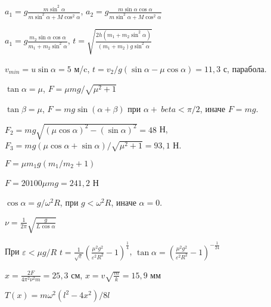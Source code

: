 \begin{Answer}{50}
$a_1 = g \frac{m \sin^2 \alpha}{m \sin^2 \alpha + M \cos^2 \alpha}$, $a_2 = g\frac{m \sin \alpha \cos \alpha}{m \sin^2 \alpha + M \cos^2 \alpha}$
\end{Answer}
\begin{Answer}{51}
$a_1 = g \frac{m_2 \sin \alpha \cos \alpha}{m_1 + m_2 \sin^2 \alpha}$, $t=\sqrt{\frac{2h(m_1+m_2\sin^2\alpha)}{(m_1+m_2)g \sin^2 \alpha}}$
\end{Answer}
\begin{Answer}{52}
$v_{min} = u \sin \alpha = 5$ м/c, $t = v_2/g(\sin \alpha - \mu \cos \alpha) = 11,3$ с, парабола.
\end{Answer}
\begin{Answer}{53}
$\tan \alpha = \mu$, $F = \mu mg / \sqrt{\mu^2 + 1}$
\end{Answer}
\begin{Answer}{54}
$\tan \beta = \mu$, $F = mg \sin (\alpha + \beta)$ при $\alpha + \ beta < \pi/2$, иначе $F = mg$.
\end{Answer}
\begin{Answer}{55}
$F_2 = mg \sqrt{(\mu \cos \alpha)^2 - (\sin \alpha)^2} = 48$ Н, $F_3 = mg(\mu \cos \alpha + \sin \alpha)/\sqrt{\mu^2 + 1} = 93,1$ Н.
\end{Answer}
\begin{Answer}{56}
$F = \mu m_1 g \left(m_1/m_2 + 1 \right)$
\end{Answer}
\begin{Answer}{57}
$F = 20100 \mu mg = 241,2$ Н
\end{Answer}
\begin{Answer}{58}
$\cos \alpha = g/\omega^2 R$, при $g < \omega^2 R$, иначе $\alpha = 0$.
\end{Answer}
\begin{Answer}{59}
$\nu = \frac{1}{2\pi}\sqrt{\frac{g}{L \cos \alpha}}$
\end{Answer}
\begin{Answer}{60}
При $\varepsilon < \mu g /R$ $t=\frac{1}{\sqrt{\varepsilon}}\left( \frac{\mu^2 g^2}{\varepsilon^2 R^2} - 1 \right)^{\frac{1}{4}}$, $\tan \alpha = \left( \frac{\mu^2 g^2}{\varepsilon^2 R^2} - 1 \right)^{-\frac{1}{24}}$
\end{Answer}
\begin{Answer}{61}
$x = \frac{2F}{4\pi^2 \nu^2 m} = 25,3$ см, $x = v\sqrt{\frac{m}{k}}=15,9$ мм
\end{Answer}
\begin{Answer}{62}
$T(x) = m \omega^2 \left( l^2 - 4x^2 \right)/8l$
\end{Answer}
